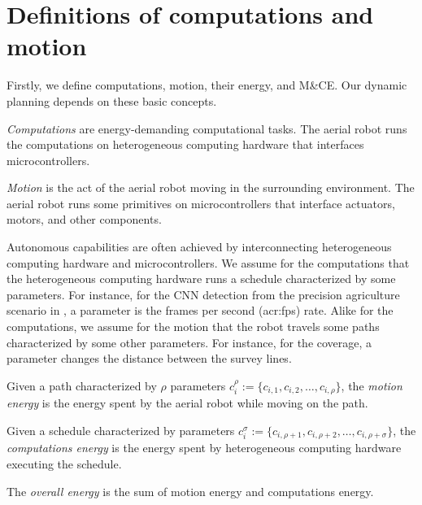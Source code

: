 \section{Definitions of computations and motion}
\label{sec:definitions}

Firstly, we define computations, motion, their energy, and M\&CE. Our dynamic planning depends on these basic concepts.

\begin{highlight}
  \begin{defn}\label{def:comps}
    \emph{Computations} are energy-demanding computational tasks. The aerial robot runs the computations on heterogeneous computing hardware that interfaces microcontrollers.
    
    \emph{Motion} is the act of the aerial robot moving in the surrounding environment. The aerial robot runs some primitives on microcontrollers that interface actuators, motors, and other components.
  \end{defn}
\end{highlight}

Autonomous capabilities are often achieved by interconnecting heterogeneous computing hardware and microcontrollers. We assume for the computations that the heterogeneous computing hardware runs a schedule characterized by some parameters. For instance, for the CNN detection from the precision agriculture scenario in , a parameter is the frames per second (\Gls{acr:fps}) rate. Alike for the computations, we assume for the motion that the robot travels some paths characterized by some other parameters. For instance, for the coverage, a parameter changes the distance between the survey lines.

\begin{highlight}
\begin{defn}\label{def:comp-mot-energy}
  Given a path characterized by $\rho$ parameters $c_i^\rho:=\{c_{i,1},c_{i,2},\dots,c_{i,\rho}\}$, the \emph{motion energy} is the energy spent by the aerial robot while moving on the path.

  Given a schedule characterized by parameters $c_i^\sigma:=\{c_{i,\rho+1},c_{i,\rho+2},\dots,c_{i,\rho+\sigma}\}$, the \emph{computations energy} is the energy spent by heterogeneous computing hardware executing the schedule.

  The \emph{overall energy} is the sum of motion energy and computations energy.
\end{defn}
\end{highlight}

